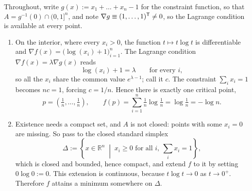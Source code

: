 \begin{exercisesolution}
\label{sol:entropy_simplex_minimum}
Throughout, write $g(x) := x_1 + \dots + x_n - 1$ for the constraint function, so that
$A = g^{-1}(0) \cap (0,1]^n$, and note $\nabla g \equiv (1,\dots,1)^{\mathsf{T}} \neq 0$, so the Lagrange
condition is available at every point.
\begin{enumerate}[label=\textbf{(\alph*)}]
  \item On the interior, where every $x_i > 0$, the function $t \mapsto t\log t$ is differentiable
    and $\nabla f(x) = \big(\log(x_i) + 1\big)_{i=1}^n$. The Lagrange condition
    $\nabla f(x) = \lambda \nabla g(x)$ reads
\[\log(x_i) + 1 = \lambda \qquad \text{for every } i,\]
    so all the $x_i$ share the common value $e^{\lambda - 1}$; call it $c$. The constraint
    $\sum_i x_i = 1$ becomes $nc = 1$, forcing $c = 1/n$. Hence there is exactly one critical point,
\[p = \left(\tfrac1n, \dots, \tfrac1n\right), \qquad
  f(p) = \sum_{i=1}^n \tfrac1n \log\tfrac1n = \log\tfrac1n = -\log n .\]

  \item Existence needs a compact set, and $A$ is not closed: points with some $x_i = 0$ are missing.
    So pass to the closed standard simplex
\[\Delta := \left\{x \in \mathbb{R}^n \;\middle|\; x_i \ge 0 \text{ for all } i, \ \textstyle\sum_i x_i = 1\right\},\]
    which is closed and bounded, hence compact, and extend $f$ to it by setting $0\log 0 := 0$. This
    extension is continuous, because $t \log t \to 0$ as $t \to 0^+$. Therefore $f$ attains a minimum
    somewhere on $\Delta$.


\end{enumerate}
\end{exercisesolution}
